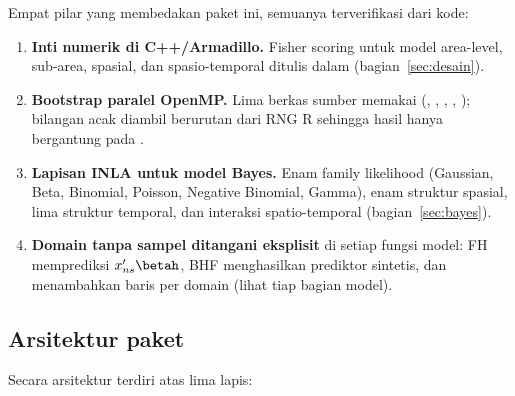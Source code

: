 Empat pilar yang membedakan paket ini, semuanya terverifikasi dari kode:

\begin{enumerate}[label=\arabic*.]
  \item \textbf{Inti numerik di C++/Armadillo.} Fisher scoring untuk model
        area-level, sub-area, spasial, dan spasio-temporal ditulis dalam
         (bagian~\ref{sec:desain}).
  \item \textbf{Bootstrap paralel OpenMP.} Lima berkas sumber memakai
        (, ,
        , ,
        ); bilangan acak diambil berurutan dari
        RNG R sehingga hasil hanya bergantung pada .
  \item \textbf{Lapisan INLA untuk model Bayes.} Enam family likelihood
        (Gaussian, Beta, Binomial, Poisson, Negative Binomial, Gamma), enam
        struktur spasial, lima struktur temporal, dan interaksi
        spatio-temporal (bagian~\ref{sec:bayes}).
  \item \textbf{Domain tanpa sampel ditangani eksplisit} di setiap fungsi
        model: FH memprediksi $x_{ns}'\betah$, BHF menghasilkan prediktor
        sintetis, dan  menambahkan baris  per
        domain (lihat tiap bagian model).
\end{enumerate}

\subsection{Arsitektur paket}\label{sec:arsitektur}

Secara arsitektur  terdiri atas lima lapis:

